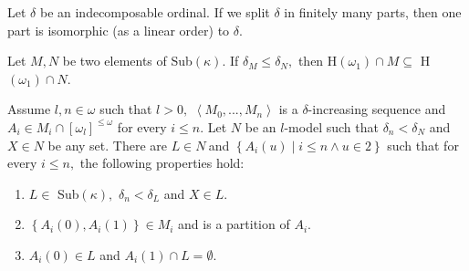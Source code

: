 \documentclass[10pt,a4paper]{amsart}
\begin{document}
\begin{proposition}
Let $\delta$ be an indecomposable ordinal. If we split $\delta$ in finitely
many parts, then one part is isomorphic (as a linear order) to $\delta.$
\label{Indescomp}
\end{proposition}

\begin{lemma}
[\textsf{CH}]Let $M,N$ be two elements of \textsf{Sub}$\left(  \kappa\right)
.$ If $\delta_{M}\leq\delta_{N},$ then \textsf{H}$\left(  \omega_{1}\right)
\cap M\subseteq$ \textsf{H}$\left(  \omega_{1}\right)  \cap N.$
\label{Lema contencion Hw1}
\end{lemma}

\begin{proposition}
[\textsf{CH}]Assume $l,n\in\omega$ such that $l>0,$ $\left\langle
M_{0},...,M_{n}\right\rangle $ is a $\delta$-increasing sequence and $A_{i}\in
M_{i}\cap\left[  \omega_{l}\right]  ^{\leq\omega}$ for every $i\leq n.$ Let
$N$ be an $l$-model such that $\delta_{n}<\delta_{N}$ and $X\in N$ be any set.
There are $L\in N\ $and $\left\{  A_{i}\left(  u\right)  \mid i\leq n\wedge
u\in2\right\}  $ such that for every $i\leq n,$ the following properties
hold:\label{Partir sucesion}

\begin{enumerate}
\item $L\in$ \textsf{Sub}$\left(  \kappa\right)  ,$ $\delta_{n}<\delta_{L}$
and $X\in L.$

\item $\left\{  A_{i}\left(  0\right)  ,A_{i}\left(  1\right)  \right\}  \in
M_{i}$ and is a partition of $A_{i}.$

\item $A_{i}\left(  0\right)  \in L$ and $A_{i}\left(  1\right)  \cap
L=\emptyset.$
\end{enumerate}
\end{proposition}
\end{document}
